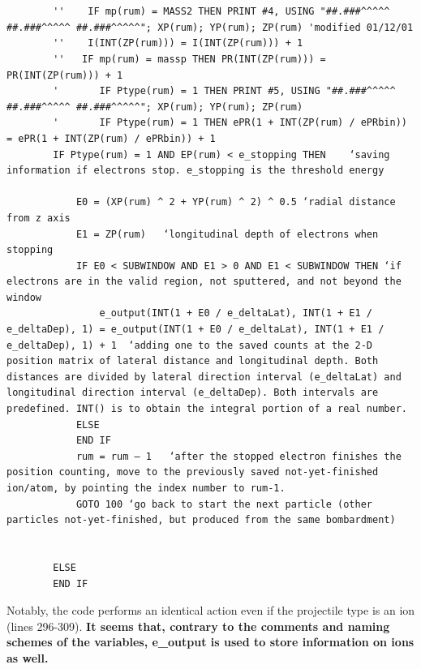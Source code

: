 \documentclass[10pt, reqno]{exam}
\begin{document}
\begin{verbatim}

    
        ''    IF mp(rum) = MASS2 THEN PRINT #4, USING "##.###^^^^^ ##.###^^^^^ ##.###^^^^^"; XP(rum); YP(rum); ZP(rum) 'modified 01/12/01
        ''    I(INT(ZP(rum))) = I(INT(ZP(rum))) + 1
        ''   IF mp(rum) = massp THEN PR(INT(ZP(rum))) = PR(INT(ZP(rum))) + 1
        '       IF Ptype(rum) = 1 THEN PRINT #5, USING "##.###^^^^^ ##.###^^^^^ ##.###^^^^^"; XP(rum); YP(rum); ZP(rum)
        '       IF Ptype(rum) = 1 THEN ePR(1 + INT(ZP(rum) / ePRbin)) = ePR(1 + INT(ZP(rum) / ePRbin)) + 1
        IF Ptype(rum) = 1 AND EP(rum) < e_stopping THEN    ‘saving information if electrons stop. e_stopping is the threshold energy
    
            E0 = (XP(rum) ^ 2 + YP(rum) ^ 2) ^ 0.5 ‘radial distance from z axis
            E1 = ZP(rum)   ‘longitudinal depth of electrons when stopping
            IF E0 < SUBWINDOW AND E1 > 0 AND E1 < SUBWINDOW THEN ‘if electrons are in the valid region, not sputtered, and not beyond the window
                e_output(INT(1 + E0 / e_deltaLat), INT(1 + E1 / e_deltaDep), 1) = e_output(INT(1 + E0 / e_deltaLat), INT(1 + E1 / e_deltaDep), 1) + 1  ‘adding one to the saved counts at the 2-D position matrix of lateral distance and longitudinal depth. Both distances are divided by lateral direction interval (e_deltaLat) and longitudinal direction interval (e_deltaDep). Both intervals are predefined. INT() is to obtain the integral portion of a real number. 
            ELSE
            END IF
            rum = rum – 1   ‘after the stopped electron finishes the position counting, move to the previously saved not-yet-finished ion/atom, by pointing the index number to rum-1. 
            GOTO 100 ‘go back to start the next particle (other particles not-yet-finished, but produced from the same bombardment)
    
    
        ELSE
        END IF
\end{verbatim}
Notably, the code performs an identical action even if the projectile type is an ion (lines 296-309). \textbf{It seems that, contrary to the comments and naming schemes of the variables, e\_output is used to store information on ions as well.} \par
\end{document}
